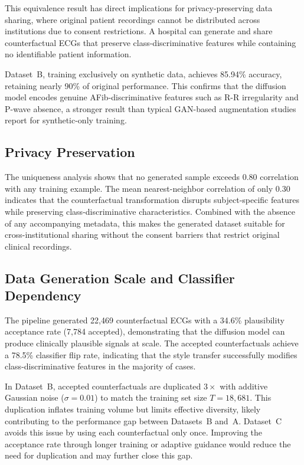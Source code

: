 \documentclass[conference]{IEEEtran}
\begin{document}
This equivalence result has direct implications for privacy-preserving data sharing, where original patient recordings cannot be distributed across institutions due to consent restrictions. A hospital can generate and share counterfactual ECGs that preserve class-discriminative features while containing no identifiable patient information.

Dataset~B, training exclusively on synthetic data, achieves 85.94\% accuracy, retaining nearly 90\% of original performance. This confirms that the diffusion model encodes genuine AFib-discriminative features such as R-R irregularity and P-wave absence, a stronger result than typical GAN-based augmentation studies report for synthetic-only training.

\subsection{Privacy Preservation}

The uniqueness analysis shows that no generated sample exceeds 0.80 correlation with any training example. The mean nearest-neighbor correlation of only 0.30 indicates that the counterfactual transformation disrupts subject-specific features while preserving class-discriminative characteristics. Combined with the absence of any accompanying metadata, this makes the generated dataset suitable for cross-institutional sharing without the consent barriers that restrict original clinical recordings.

\subsection{Data Generation Scale and Classifier Dependency}

The pipeline generated 22,469 counterfactual ECGs with a 34.6\% plausibility acceptance rate (7,784 accepted), demonstrating that the diffusion model can produce clinically plausible signals at scale. The accepted counterfactuals achieve a 78.5\% classifier flip rate, indicating that the style transfer successfully modifies class-discriminative features in the majority of cases.

In Dataset~B, accepted counterfactuals are duplicated $3{\times}$ with additive Gaussian noise ($\sigma{=}0.01$) to match the training set size $T{=}18{,}681$. This duplication inflates training volume but limits effective diversity, likely contributing to the performance gap between Datasets~B and~A. Dataset~C avoids this issue by using each counterfactual only once. Improving the acceptance rate through longer training or adaptive guidance would reduce the need for duplication and may further close this gap.
\end{document}
